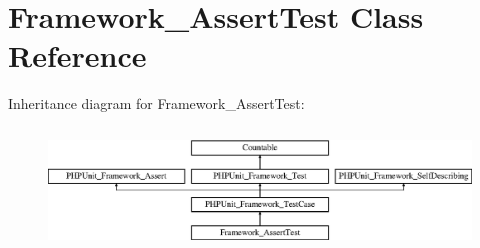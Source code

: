 \hypertarget{class_framework___assert_test}{}\section{Framework\+\_\+\+Assert\+Test Class Reference}
\label{class_framework___assert_test}
Inheritance diagram for Framework\+\_\+\+Assert\+Test\+:\begin{figure}[H]
\begin{center}
\leavevmode
\includegraphics[height=3.303835cm]{class_framework___assert_test}
\end{center}
\end{figure}
